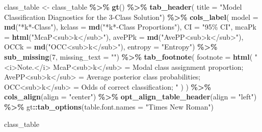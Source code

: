 \documentclass[
]{book}
\newenvironment{Shaded}{\begin{snugshade}}{\end{snugshade}}
\newcommand{\AttributeTok}[1]{\textcolor[rgb]{0.13,0.29,0.53}{#1}}
\newcommand{\DecValTok}[1]{\textcolor[rgb]{0.00,0.00,0.81}{#1}}
\newcommand{\FunctionTok}[1]{\textcolor[rgb]{0.13,0.29,0.53}{\textbf{#1}}}
\newcommand{\NormalTok}[1]{#1}
\newcommand{\OtherTok}[1]{\textcolor[rgb]{0.56,0.35,0.01}{#1}}
\newcommand{\SpecialCharTok}[1]{\textcolor[rgb]{0.81,0.36,0.00}{\textbf{#1}}}
\newcommand{\StringTok}[1]{\textcolor[rgb]{0.31,0.60,0.02}{#1}}
\begin{document}
\begin{Shaded}
\begin{Highlighting}[]
\NormalTok{class\_table }\OtherTok{\textless{}{-}}\NormalTok{ class\_table }\SpecialCharTok{\%\textgreater{}\%} 
  \FunctionTok{gt}\NormalTok{() }\SpecialCharTok{\%\textgreater{}\%}
    \FunctionTok{tab\_header}\NormalTok{(}
    \AttributeTok{title =} \StringTok{"Model Classification Diagnostics for the 3{-}Class Solution"}\NormalTok{) }\SpecialCharTok{\%\textgreater{}\%}
    \FunctionTok{cols\_label}\NormalTok{(}
      \AttributeTok{model =} \FunctionTok{md}\NormalTok{(}\StringTok{"*k*{-}Class"}\NormalTok{),}
      \AttributeTok{kclass =} \FunctionTok{md}\NormalTok{(}\StringTok{"*k*{-}Class Proportions"}\NormalTok{),}
      \AttributeTok{CI =} \StringTok{"95\% CI"}\NormalTok{,}
      \AttributeTok{mcaPk =} \FunctionTok{html}\NormalTok{(}\StringTok{"McaP\textless{}sub\textgreater{}k\textless{}/sub\textgreater{}"}\NormalTok{),}
      \AttributeTok{avePPk =} \FunctionTok{md}\NormalTok{(}\StringTok{"AvePP\textless{}sub\textgreater{}k\textless{}/sub\textgreater{}"}\NormalTok{),}
      \AttributeTok{OCCk =} \FunctionTok{md}\NormalTok{(}\StringTok{"OCC\textless{}sub\textgreater{}k\textless{}/sub\textgreater{}"}\NormalTok{),}
      \AttributeTok{entropy =} \StringTok{"Entropy"}\NormalTok{) }\SpecialCharTok{\%\textgreater{}\%} 
    \FunctionTok{sub\_missing}\NormalTok{(}\DecValTok{7}\NormalTok{,}
              \AttributeTok{missing\_text =} \StringTok{""}\NormalTok{) }\SpecialCharTok{\%\textgreater{}\%}
    \FunctionTok{tab\_footnote}\NormalTok{(}
    \AttributeTok{footnote =} \FunctionTok{html}\NormalTok{(}
      \StringTok{"\textless{}i\textgreater{}Note.\textless{}/i\textgreater{} McaP\textless{}sub\textgreater{}k\textless{}/sub\textgreater{} = Modal class assignment proportion; AvePP\textless{}sub\textgreater{}k\textless{}/sub\textgreater{} = Average posterior class probabilities; OCC\textless{}sub\textgreater{}k\textless{}/sub\textgreater{} = Odds of correct classification; "}
\NormalTok{    )}
\NormalTok{  ) }\SpecialCharTok{\%\textgreater{}\%} 
  \FunctionTok{cols\_align}\NormalTok{(}\AttributeTok{align =} \StringTok{"center"}\NormalTok{) }\SpecialCharTok{\%\textgreater{}\%} 
  \FunctionTok{opt\_align\_table\_header}\NormalTok{(}\AttributeTok{align =} \StringTok{"left"}\NormalTok{) }\SpecialCharTok{\%\textgreater{}\%} 
\NormalTok{  gt}\SpecialCharTok{::}\FunctionTok{tab\_options}\NormalTok{(}\AttributeTok{table.font.names =} \StringTok{"Times New Roman"}\NormalTok{)}

\NormalTok{class\_table}
\end{Highlighting}
\end{Shaded}
\end{document}
